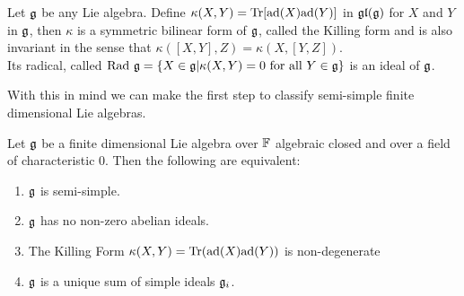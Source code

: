 \begin{defi}
	Let $\mathfrak{g}$ be any Lie algebra. Define $\kappa(X,Y)= \text{Tr} [\text{ad}(X)\text{ad}(Y)]$ in $\mathfrak{gl}(\mathfrak{g})$ for $X$ and $Y$ in $\mathfrak{g}$, then $\kappa$ is a symmetric bilinear form of $\mathfrak{g}$, called the Killing form and is also invariant in the sense that $\kappa([X,Y],Z)=\kappa(X,[Y,Z])$.\\
	Its radical, called $\text{Rad } \mathfrak{g} = \{X \in \mathfrak{g} | \kappa(X,Y)=0 \text{ for all } Y \in \mathfrak{g}\}$ is an ideal of $\mathfrak{g}$. 
	\label{Killing Form}
\end{defi}
With this in mind we can make the first step to classify semi-simple finite dimensional Lie algebras.
\begin{teo}
	Let $\mathfrak{g}$ be a finite dimensional Lie algebra over $\mathbb{F}$ algebraic closed and over a field of characteristic $0$. Then the following are equivalent:
	\begin{enumerate}
		\item $\mathfrak{g}$ is semi-simple.
		\item $\mathfrak{g}$ has no non-zero abelian ideals.
		\item The Killing Form $\kappa(X,Y)=\text{Tr}(\text{ad}(X)\text{ad}(Y))$ is non-degenerate
		\item $\mathfrak{g}$ is a unique sum of simple ideals $\mathfrak{g}_i$.
	\end{enumerate}
\end{teo}
